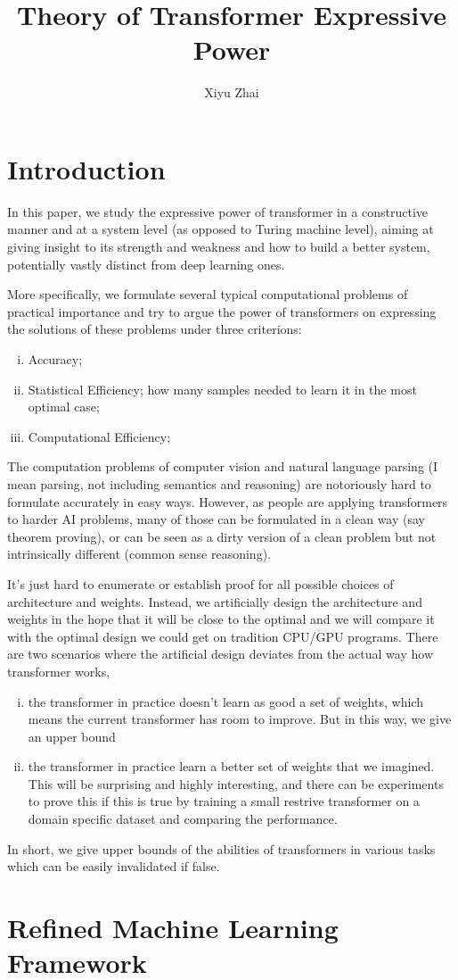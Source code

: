 \documentclass[11pt, oneside]{article}   	%
\title{Theory of Transformer Expressive Power}
\author{Xiyu Zhai}
\date{}							%
\theoremstyle{definition}
\begin{document}
\maketitle
\tableofcontents

\section{Introduction}

In this paper, we study the expressive power of transformer in a constructive manner and at a system level (as opposed to Turing machine level), aiming at giving insight to its strength and weakness and how to build a better system, potentially vastly distinct from deep learning ones.

More specifically, we formulate several typical computational problems of practical importance and try to argue the power of transformers on expressing the solutions of these problems under three criterions:

\begin{enumerate}[(i)]
	\item Accuracy;
	\item Statistical Efficiency; how many samples needed to learn it in the most optimal case;
	\item Computational Efficiency;
\end{enumerate}

\begin{rmk}
	The computation problems of computer vision and natural language parsing (I mean parsing, not including semantics and reasoning) are notoriously hard to formulate accurately in easy ways. However, as people are applying transformers to harder AI problems, many of those can be formulated in a clean way (say theorem proving), or can be seen as a dirty version of a clean problem but not intrinsically different (common sense reasoning).
\end{rmk}

It's just hard to enumerate or establish proof for all possible choices of architecture and weights. Instead, we artificially design the architecture and weights in the hope that it will be close to the optimal and we will compare it with the optimal design we could get on tradition CPU/GPU programs. There are two scenarios where the artificial design deviates from the actual way how transformer works,

\begin{enumerate}[(i)]
	\item the transformer in practice doesn't learn as good a set of weights, which means the current transformer has room to improve. But in this way, we give an upper bound
	\item the transformer in practice learn a better set of weights that we imagined. This will be surprising and highly interesting, and there can be experiments to prove this if this is true by training a small restrive transformer on a domain specific dataset and comparing the performance.
\end{enumerate}

In short, we give upper bounds of the abilities of transformers in various tasks which can be easily invalidated if false.


\section{Refined Machine Learning Framework}
\end{document}
